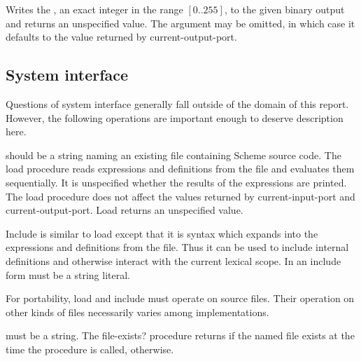 \begin{entry}{%
}

Writes the , an exact integer in the range $[0..255]$, to
the given binary output  and returns an unspecified value.
The  argument may be omitted, in which case it defaults to
the value returned by {\cf current-output-port}.

\end{entry}


\subsection{System interface}

Questions of system interface generally fall outside of the domain of this
report.  However, the following operations are important enough to
deserve description here.


\begin{entry}{%
}


 should be a string naming an existing file
containing Scheme source code.  The {\cf load} procedure reads
expressions and definitions from the file and evaluates them
sequentially.  It is unspecified whether the results of the expressions
are printed.  The {\cf load} procedure does not affect the values
returned by {\cf current-input-port} and {\cf current-output-port}.
{\cf Load} returns an unspecified value.

{\cf Include} is similar to {\cf load} except that it is syntax which
expands into the expressions and definitions from the file.  Thus it
can be used to include internal definitions and otherwise interact
with the current lexical scope.  In an {\cf include} form
 must be a string literal.

\begin{rationale}
For portability, {\cf load} and {\cf include} must operate on source files.
Their operation on other kinds of files necessarily varies among
implementations.
\end{rationale}
\end{entry}

\begin{entry}{%
}

 must be a string. The {\cf file-exists?} procedure returns
\schtrue{} if the named file exists at the time the procedure is called,
\schfalse{} otherwise.

\end{entry}

